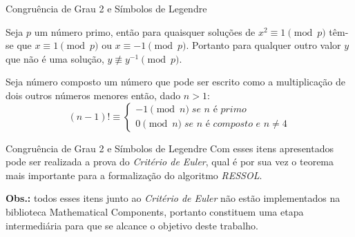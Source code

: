\begin{frame}[fragile]{Congruência de Grau 2 e Símbolos de Legendre}

        \begin{lema} Seja $p$ um número primo, então para quaisquer soluções de $x^2 \equiv 1 \pmod{p}$ têm-se que $x \equiv 1 \pmod{p}$ ou $x \equiv -1 \pmod{p}$. Portanto para qualquer outro valor $y$ que não é uma solução, $y \not\equiv y^{-1} \pmod{p}$.
        \label{lema : eq1modp}
        \end{lema}

        \begin{teorema} \label{teorema : wilson}
            Seja número composto um número que pode ser escrito como a multiplicação de dois outros números menores então, dado $n > 1$:
            \begin{equation*}
                (n - 1)! \equiv \begin{cases}
                                -1 \pmod{n} \; \textit{se $n$ é primo} \\
                                0 \pmod{n} \; \textit{se $n$ é composto e $n \neq 4$}
                                \end{cases}
            \end{equation*}
        \end{teorema}
        
\end{frame}



\begin{frame}{Congruência de Grau 2 e Símbolos de Legendre}
        Com esses itens apresentados pode ser realizada a prova do \textit{Critério de Euler}, qual é por sua vez o teorema mais importante para a formalização do algoritmo \textit{RESSOL}.
        \smallskip
        \smallskip

        \textbf{Obs.:} todos esses itens junto ao \textit{Critério de Euler} não estão implementados na biblioteca Mathematical Components, portanto constituem uma etapa intermediária para que se alcance o objetivo deste trabalho.
\end{frame}